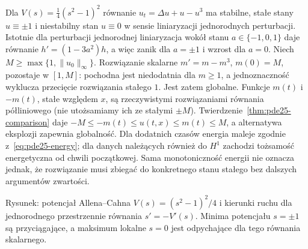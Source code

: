 \begin{przyklad}
Dla $V(s)=\frac14(s^2-1)^2$ równanie
$u_t=\Delta u+u-u^3$ ma stabilne, stałe stany $u\equiv\pm1$
i niestabilny stan $u\equiv0$ w sensie liniaryzacji
jednorodnych perturbacji. Istotnie dla perturbacji jednorodnej liniaryzacja
wokół stanu $a\in\{-1,0,1\}$ daje równanie
$h'=(1-3a^2)h$, a więc zanik dla $a=\pm1$
i wzrost dla $a=0$. Niech
$M\ge\max\{1,\|u_0\|_\infty\}$.
Rozwiązanie skalarne $m'=m-m^3$, $m(0)=M$,
pozostaje w $[1,M]$: pochodna jest niedodatnia
dla $m\ge1$, a jednoznaczność wyklucza przecięcie
rozwiązania stałego $1$. Jest zatem globalne.
Funkcje $m(t)$ i $-m(t)$, stałe względem $x$,
są rzeczywistymi rozwiązaniami równania półliniowego
(nie utożsamiamy ich ze stałymi $\pm M$).
Twierdzenie~\ref{thm:pde25-comparison} daje
$-M\le-m(t)\le u(t,x)\le m(t)\le M$,
a alternatywa eksplozji zapewnia globalność.
Dla dodatnich czasów energia maleje zgodnie
z~\eqref{eq:pde25-energy}; dla danych należących
również do $H^1$ zachodzi tożsamość energetyczna
od chwili początkowej.
Sama monotoniczność energii nie oznacza jednak,
że rozwiązanie musi zbiegać do konkretnego stanu
stałego bez dalszych argumentów zwartości.
\end{przyklad}

\begin{center}

\small Rysunek: potencjał Allena--Cahna
$V(s)=(s^2-1)^2/4$ i kierunki ruchu dla jednorodnego
przestrzennie równania $s'=-V'(s)$. Minima potencjału
$s=\pm1$ są przyciągające, a maksimum lokalne $s=0$
jest odpychające dla tego równania skalarnego.
\end{center}


